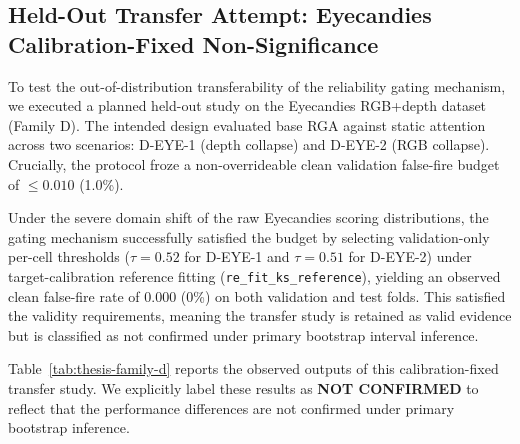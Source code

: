 \documentclass[11pt]{article}
\begin{document}
\subsection{Held-Out Transfer Attempt: Eyecandies Calibration-Fixed Non-Significance}
\label{sec:thesis-family-d-excluded}
To test the out-of-distribution transferability of the reliability gating mechanism, we executed a planned held-out study on the Eyecandies RGB+depth dataset (Family D). The intended design evaluated base RGA against static attention across two scenarios: D-EYE-1 (depth collapse) and D-EYE-2 (RGB collapse). Crucially, the protocol froze a non-overrideable clean validation false-fire budget of $\le 0.010$ (1.0\%). 

Under the severe domain shift of the raw Eyecandies scoring distributions, the gating mechanism successfully satisfied the budget by selecting validation-only per-cell thresholds ($\tau = 0.52$ for D-EYE-1 and $\tau = 0.51$ for D-EYE-2) under target-calibration reference fitting (\texttt{re\_fit\_ks\_reference}), yielding an observed clean false-fire rate of $0.000$ (0\%) on both validation and test folds. This satisfied the validity requirements, meaning the transfer study is retained as valid evidence but is classified as not confirmed under primary bootstrap interval inference.

Table~\ref{tab:thesis-family-d} reports the observed outputs of this calibration-fixed transfer study. We explicitly label these results as \textbf{NOT CONFIRMED} to reflect that the performance differences are not confirmed under primary bootstrap inference.

\end{document}
